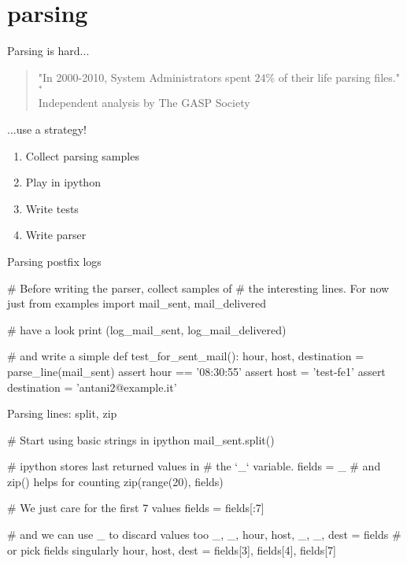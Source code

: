 \section{parsing}



\begin{frame}[fragile]{Parsing is hard...}
\begin{verse}
"In 2000-2010, System Administrators spent $24\%$ of their life parsing files."$^{*}$\\
\hfill Independent analysis by The GASP Society
\end{verse}
\end{frame}


\begin{frame}[fragile]{...use a strategy!}
\begin{enumerate}
\item Collect parsing samples
\item Play in ipython
\item Write tests
\item Write parser
\end{enumerate}
\end{frame}



\begin{frame}[fragile]{Parsing postfix logs}
\begin{pythoncode}
# Before writing the parser, collect samples of
#  the interesting lines. For now just 
from examples import mail_sent, mail_delivered

# have a look 
print (log_mail_sent, log_mail_delivered)

# and write a simple 
def test_for_sent_mail():
    hour, host, destination = parse_line(mail_sent)
    assert hour == '08:30:55'
    assert host = 'test-fe1'
    assert destination = 'antani2@example.it'

\end{pythoncode}
\end{frame}


\begin{frame}[fragile]{Parsing lines: split, zip}
\begin{pythoncode}
# Start using basic strings in ipython
mail_sent.split()

# ipython stores last returned values in 
#  the `_` variable.
fields = _
# and zip() helps for counting
zip(range(20), fields)

# We just care for the first 7 values
fields = fields[:7]

# and we can use _ to discard values too
_, _, hour, host, _, _, dest = fields
# or pick fields singularly
hour, host, dest = fields[3], fields[4], fields[7]

\end{pythoncode}
\end{frame}


